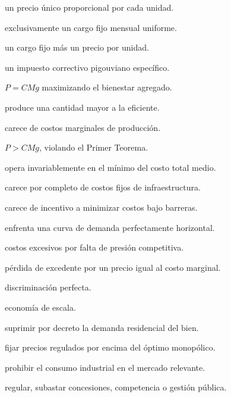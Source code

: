 \begin{opts}
    \item un precio único proporcional por cada unidad.
    \item exclusivamente un cargo fijo mensual uniforme.
    \item un cargo fijo más un precio por unidad.
    \item un impuesto correctivo pigouviano específico.
\end{opts}

\begin{opts}
    \item $P=CMg$ maximizando el bienestar agregado.
    \item produce una cantidad mayor a la eficiente.
    \item carece de costos marginales de producción.
    \item $P>CMg$, violando el Primer Teorema.
\end{opts}

\begin{opts}
    \item opera invariablemente en el mínimo del costo total medio.
    \item carece por completo de costos fijos de infraestructura.
    \item carece de incentivo a minimizar costos bajo barreras.
    \item enfrenta una curva de demanda perfectamente horizontal.
\end{opts}

\begin{opts}
    \item costos excesivos por falta de presión competitiva.
    \item pérdida de excedente por un precio igual al costo marginal.
    \item discriminación perfecta.
    \item economía de escala.
\end{opts}

\begin{opts}
    \item suprimir por decreto la demanda residencial del bien.
    \item fijar precios regulados por encima del óptimo monopólico.
    \item prohibir el consumo industrial en el mercado relevante.
    \item regular, subastar concesiones, competencia o gestión pública.
\end{opts}

